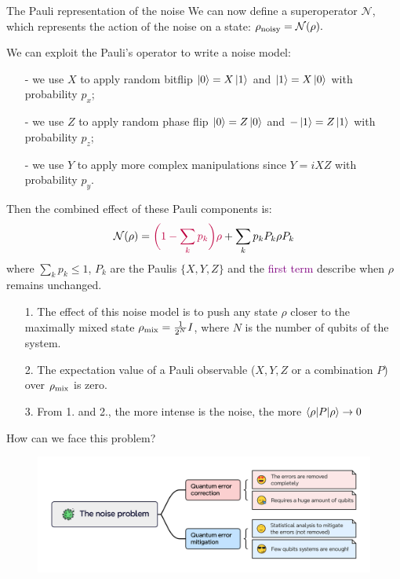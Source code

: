 \documentclass[aspectratio=169, 8pt, xcolor={svgnames}, hyperref={linkcolor=black}]{beamer}
\begin{document}
\begin{frame}{The Pauli representation of the noise}
We can now define a superoperator $\mathcal{N}$, which represents the action of the 
noise on a state:
$ \rho_{\rm noisy} = \mathcal{N}(\rho). $ \pause

We can exploit the Pauli's operator to write a noise model:
\begin{itemize}[noitemsep]
\item[-] we use $X$ to apply random bitflip $\ket{0}=X\ket{1}$ and $\ket{1}=X\ket{0}$ with probability $p_x$;
\item[-] we use $Z$ to apply random phase flip $\ket{0}=Z\ket{0}$ and $-\ket{1}=Z\ket{1}$ with probability $p_z$;
\item[-] we use $Y$ to apply more complex manipulations since $Y=iXZ$ with probability $p_y$. \pause
\end{itemize}
Then the combined effect of these Pauli components is:
$$ \mathcal{N}(\rho) = \textcolor{purple}{\biggl(1 - \sum_{k}p_k\biggr) \rho} + \sum_k p_k P_k \rho P_k $$
where $\sum_k p_k \leq 1$, $P_k$ are the Paulis $\{X, Y, Z\}$
 and the \textcolor{purple}{first term} describe when $\rho$ remains unchanged. \pause

\vspace{0.2cm}
\begin{tcolorbox}[colback=red!15, title=Effect of the noise when computing expectation values]
\begin{itemize}[noitemsep]
\item[1.] The effect of this noise model is to push any state $\rho$ closer to the maximally mixed state $\rho_{\rm mix}=\frac{1}{2^N} I$, 
where $N$ is the number of qubits of the system.
\item[2.] The expectation value of a Pauli observable ($X, Y, Z$ or a combination $P$) over $\rho_{\rm mix}$ is zero.
\item[3.] From 1. and 2., the more intense is the noise, the more $\braket{\rho|P|\rho}\to 0$
\end{itemize}
\end{tcolorbox}

\end{frame}

\begin{frame}{How can we face this problem?}
\begin{figure}
    \includegraphics[width=1\textwidth]{figures/qem_qec.pdf}
\end{figure}
\end{frame}
\end{document}
